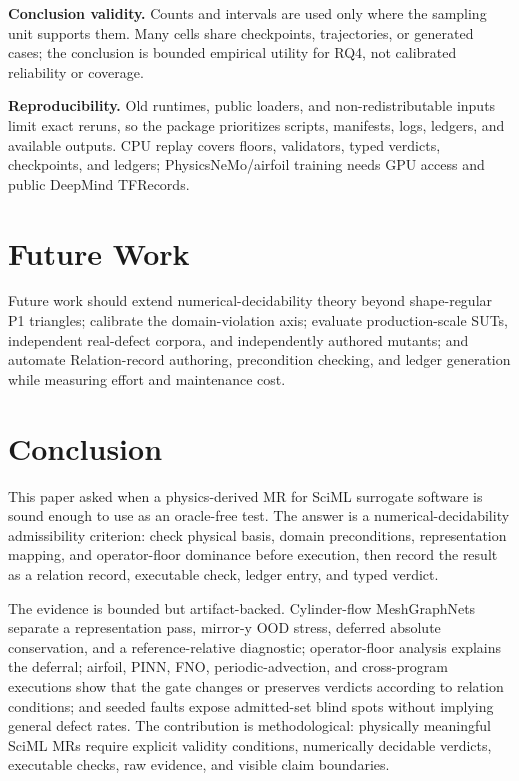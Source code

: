 \documentclass[preprint,12pt,authoryear]{elsarticle}
\begin{document}
\textbf{Conclusion validity.} Counts and intervals are used only where the sampling unit supports them. Many cells share checkpoints, trajectories, or generated cases; the conclusion is bounded empirical utility for RQ4, not calibrated reliability or coverage.

\textbf{Reproducibility.} Old runtimes, public loaders, and non-redistributable inputs limit exact reruns, so the package prioritizes scripts, manifests, logs, ledgers, and available outputs. CPU replay covers floors, validators, typed verdicts, checkpoints, and ledgers; PhysicsNeMo/airfoil training needs GPU access and public DeepMind TFRecords.

\section{Future Work}
\label{sec:future-work}

Future work should extend numerical-decidability theory beyond shape-regular P1 triangles; calibrate the domain-violation axis; evaluate production-scale SUTs, independent real-defect corpora, and independently authored mutants; and automate Relation-record authoring, precondition checking, and ledger generation while measuring effort and maintenance cost.

\section{Conclusion}
\label{sec:conclusion}

This paper asked when a physics-derived MR for SciML surrogate software is sound enough to use as an oracle-free test. The answer is a numerical-decidability admissibility criterion: check physical basis, domain preconditions, representation mapping, and operator-floor dominance before execution, then record the result as a relation record, executable check, ledger entry, and typed verdict.

The evidence is bounded but artifact-backed. Cylinder-flow MeshGraphNets separate a representation pass, mirror-y OOD stress, deferred absolute conservation, and a reference-relative diagnostic; operator-floor analysis explains the deferral; airfoil, PINN, FNO, periodic-advection, and cross-program executions show that the gate changes or preserves verdicts according to relation conditions; and seeded faults expose admitted-set blind spots without implying general defect rates. The contribution is methodological: physically meaningful SciML MRs require explicit validity conditions, numerically decidable verdicts, executable checks, raw evidence, and visible claim boundaries.
\end{document}
